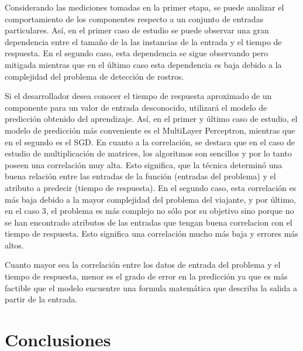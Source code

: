 Considerando las mediciones tomadas en la primer etapa, se puede analizar
el comportamiento de los componentes respecto a un conjunto de entradas
particulares. Así, en el primer caso de estudio se puede observar
una gran dependencia entre el tamaño de la las instancias de la entrada
y el tiempo de respuesta. En el segundo caso, esta dependencia se
sigue observando pero mitigada mientras que en el último caso esta
dependencia es baja debido a la complejidad del problema de detección
de rostros. 

Si el desarrollador desea conocer el tiempo de respuesta aproximado
de un componente para un valor de entrada desconocido, utilizará el
modelo de predicción obtenido del aprendizaje. Así, en el primer y
último caso de estudio, el modelo de predicción más conveniente es
el MultiLayer Perceptron, mientras que en el segundo es el \ac{SGD}.
En cuanto a la correlación, se destaca que en el caso de estudio de
multiplicación de matrices, los algoritmos son sencillos y por lo
tanto poseen una correlación muy alta. Esto significa, que la técnica
determinó una buena relación entre las entradas de la función (entradas
del problema) y el atributo a predecir (tiempo de respuesta). En el
segundo caso, esta correlación es más baja debido a la mayor complejidad
del problema del viajante, y por último, en el caso 3, el problema
es más complejo no sólo por su objetivo sino porque no se han encontrado
atributos de las entradas que tengan buena correlacion con el tiempo
de respuesta. Esto significa una correlación mucho más baja y errores
más altos.



Cuanto mayor sea la correlación entre los datos de entrada del problema
y el tiempo de respuesta, menor es el grado de error en la predicción
ya que es más factible que el modelo encuentre una formula matemática
que describa la salida a partir de la entrada.


\section{Conclusiones \label{sec:Conclusiones}}

